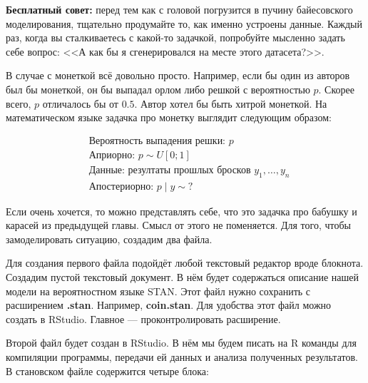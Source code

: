 \textbf{Бесплатный совет:} перед тем как с головой погрузится в пучину байесовского моделирования, тщательно продумайте то, как именно устроены данные. Каждый раз, когда вы сталкиваетесь с какой-то задачкой, попробуйте мысленно задать себе вопрос: <<А как бы я сгенерировался на месте этого датасета?>>. 

В случае с монеткой всё довольно просто.  Например, если бы один из авторов был бы монеткой, он бы выпадал орлом либо решкой с вероятностью $p$. Скорее всего, $p$ отличалось бы от $0.5$. Автор хотел бы быть хитрой монеткой.  На математическом языке задачка про монетку выглядит следующим образом: 
 
 \begin{equation*}
 \begin{aligned}
&\text{Вероятность выпадения решки: } p \\
&\text{Априорно: }  p \sim U[0;1] \\
&\text{Данные: резултаты прошлых бросков } y_1, \ldots, y_n \\
&\text{Апостериорно: } p \mid y \sim \text{?} 
\end{aligned}
\end{equation*}  

\vspace{0.3cm}
 
Если очень хочется, то можно представлять себе, что это задачка про бабушку и карасей из предыдущей главы. Смысл от этого не поменяется.  Для того, чтобы замоделировать ситуацию, создадим два файла. 
 
 Для создания первого файла подойдёт любой текстовый редактор вроде блокнота. Создадим пустой текстовый документ. В нём будет содержаться описание нашей модели на вероятностном языке STAN. Этот файл нужно сохранить с расширением \textbf{.stan}. Например, \textbf{coin.stan}.  Для удобства этот файл можно создать в RStudio. Главное ---  проконтролировать расширение. 
 
 Второй файл будет создан в RStudio.  В нём мы будем писать на R команды для компиляции программы, передачи ей данных и анализа полученных результатов.  В становском файле содержится четыре блока: 
 

